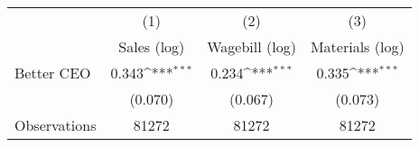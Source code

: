 {
\def\sym#1{\ifmmode^{#1}\else\(^{#1}\)\fi}
\begin{tabular}{l*{3}{c}}
\hline\hline
                    &\multicolumn{1}{c}{(1)}&\multicolumn{1}{c}{(2)}&\multicolumn{1}{c}{(3)}\\
                    &\multicolumn{1}{c}{Sales (log)}&\multicolumn{1}{c}{Wagebill (log)}&\multicolumn{1}{c}{Materials (log)}\\
\hline
Better CEO          &       0.343\sym{***}&       0.234\sym{***}&       0.335\sym{***}\\
                    &     (0.070)         &     (0.067)         &     (0.073)         \\
\hline
Observations        &       81272         &       81272         &       81272         \\
\hline\hline
\end{tabular}
}
